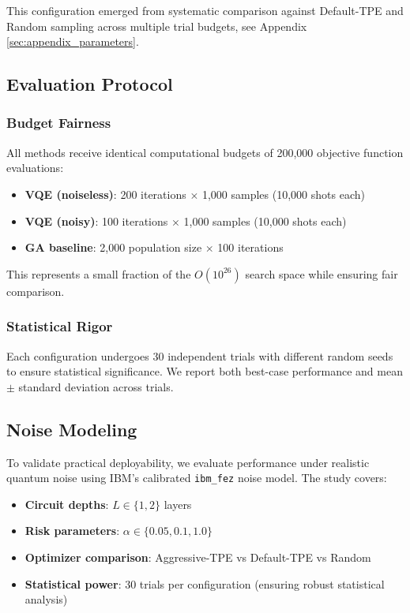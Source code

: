 This configuration emerged from systematic comparison against Default-TPE and Random sampling across multiple trial budgets, see Appendix \ref{sec:appendix_parameters}.


\subsection{Evaluation Protocol}

\subsubsection{Budget Fairness}
All methods receive identical computational budgets of 200,000 objective function evaluations:
\begin{itemize}[nosep]
    \item \textbf{VQE (noiseless)}: 200 iterations $\times$ 1,000 samples (10,000 shots each)
    \item \textbf{VQE (noisy)}: 100 iterations $\times$ 1,000 samples (10,000 shots each)  
    \item \textbf{GA baseline}: 2,000 population size $\times$ 100 iterations
\end{itemize}
This represents a small fraction of the $O(10^{26})$ search space while ensuring fair comparison.

\subsubsection{Statistical Rigor}
Each configuration undergoes 30 independent trials with different random seeds to ensure statistical significance.
We report both best-case performance and mean $\pm$ standard deviation across trials.


\subsection{Noise Modeling}

To validate practical deployability, we evaluate performance under realistic quantum noise using IBM's calibrated \texttt{ibm\_fez} noise model.
The study covers:
\begin{itemize}[nosep]
    \item \textbf{Circuit depths}: $L \in \{1, 2\}$ layers
    \item \textbf{Risk parameters}: $\alpha \in \{0.05, 0.1, 1.0\}$  
    \item \textbf{Optimizer comparison}: Aggressive-TPE vs Default-TPE vs Random
    \item \textbf{Statistical power}: 30 trials per configuration (ensuring robust statistical analysis)
\end{itemize}

